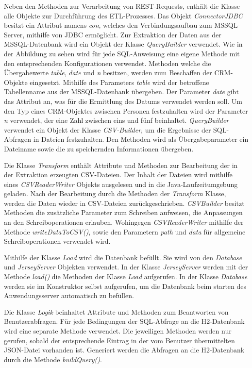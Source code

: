 Neben den Methoden zur Verarbeitung von REST-Requests, enthält die Klasse alle Objekte zur Durchführung des ETL-Prozesses. Das Objekt  \textit{ConnectorJDBC} besitzt ein Attribut namens \textit{con}, welches den Verbindungsaufbau zum MSSQL-Server, mithilfe von JDBC ermöglicht. Zur Extraktion der Daten aus der MSSQL-Datenbank wird ein Objekt der Klasse \textit{QueryBuilder} verwendet. Wie in der Abbildung zu sehen wird für jede SQL-Anweisung eine eigene Methode mit den entsprechenden Konfigurationen verwendet. Methoden welche die Übergabewerte \textit{table}, \textit{date} und \textit{n} besitzen, werden zum Beschaffen der CRM-Objekte eingesetzt. Mithilfe des Parameters \textit{table} wird der betroffene Tabellenname aus der MSSQL-Datenbank übergeben. Der Parameter \textit{date} gibt das Attribut an, was für die Ermittlung des Datums verwendet werden soll. Um den Typ eines CRM-Objektes zwischen Personen festzuhalten wird der Parameter \textit{n} verwendet, der eine Zahl zwischen eins und fünf beinhaltet. \textit{QueryBuilder} verwendet ein Objekt der Klasse \textit{CSV-Builder}, um die Ergebnisse der SQL-Abfragen in Dateien festzuhalten. Den Methoden wird als Übergabeparameter ein Dateiname sowie die zu speichernden Informationen übergeben.

Die Klasse \textit{Transform} enthält Attribute und Methoden zur Bearbeitung der in der Extraktion erzeugten CSV-Dateien. Der Inhalt der Dateien wird mithilfe eines \textit{CSVReaderWriter} Objekts ausgelesen und in die Java-Laufzeitumgebung geladen. Nach der Bearbeitung durch die Methoden der \textit{Transform} Klasse, werden die Daten wieder in CSV-Dateien zurückgeschrieben. \textit{CSVBuilder} besitzt Methoden die zusätzliche Parameter zum Schreiben aufweisen, die Anpassungen an den Schreiboperationen erlauben. Wohingegen \textit{CSVReaderWriter} mithilfe der Methode \textit{writeDataToCSV()}, sowie den Parametern \textit{path} und \textit{data} für allgemeine Schreiboperationen verwendet wird.

Mithilfe der Klasse \textit{Load} wird die Datenbank befüllt. Sie wird von den \textit{Database} und \textit{JerseyServer} Objekten verwendet. In der Klasse \textit{JerseyServer} werden mit der Methode \textit{load()} die Methoden der Klasse \textit{Load} aufgerufen. In der Klasse \textit{Database} werden sie im Konstruktor selbst aufgerufen, um die Datenbank beim starten des Anwendungsserver automatisch zu befüllen. 

Die Klasse \textit{Logik} beinhaltet Attribute und Methoden zum Beantworten von Benutzerabfragen. Für jede Bedingungen der SQL-Abfrage an die H2-Datenbank wird eine separate Methode verwendet. Die jeweiligen Methoden werden nur gerufen, sobald der entsprechende Eintrag in der vom Benutzer übermittelten JSON-Datei vorhanden ist. Generiert werden die Abfragen an die H2-Datenbank durch die Methode \textit{buildQuery()}. 

